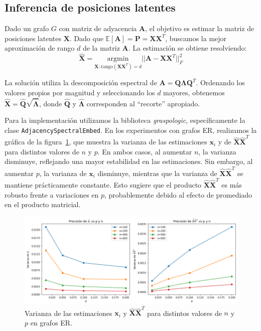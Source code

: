 \documentclass{article}
\begin{document}
\subsection{Inferencia de posiciones latentes}

Dado un grafo $G$ con matriz de adyacencia $\mathbf{A}$, el objetivo es estimar la matriz de posiciones latentes $\mathbf{X}$. Dado que $\mathbb{E}[\mathbf{A}] = \mathbf{P} = \mathbf{X}\mathbf{X}^T$, buscamos la mejor aproximación de rango $d$ de la matriz $\mathbf{A}$. La estimación se obtiene resolviendo:
\begin{equation}
    \hat{\mathbf{X}} = \underset{\mathbf{X}: \text{rango}(\mathbf{X}\mathbf{X}^T) = d}{\mathrm{argmin}} ||\mathbf{A} - \mathbf{X}\mathbf{X}^T||^2_F
\end{equation}

La solución utiliza la descomposición espectral de $\mathbf{A} = \mathbf{Q}\boldsymbol{\Lambda}\mathbf{Q}^T$. Ordenando los valores propios por magnitud y seleccionando los $d$ mayores, obtenemos $\hat{\mathbf{X}} = \hat{\mathbf{Q}}\sqrt{\hat{\boldsymbol{\Lambda}}}$, donde $\hat{\mathbf{Q}}$ y $\hat{\boldsymbol{\Lambda}}$ corresponden al ``recorte'' apropiado.

Para la implementación utilizamos la biblioteca \textit{graspologic}, específicamente la clase \newline
\verb|AdjacencySpectralEmbed|. En los experimentos con grafos ER, realizamos la gráfica de la figura~\ref{fig:precision}, que muestra la varianza de las estimaciones $\mathbf{x}_i$ y de $\hat{\mathbf{X}}\hat{\mathbf{X}}^T$ para distintos valores de $n$ y $p$. En ambos casos, al aumentar $n$, la varianza disminuye, reflejando una mayor estabilidad en las estimaciones. Sin embargo, al aumentar $p$, la varianza de $\mathbf{x}_i$ disminuye, mientras que la varianza de $\hat{\mathbf{X}}\hat{\mathbf{X}}^T$ se mantiene prácticamente constante. Esto sugiere que el producto $\hat{\mathbf{X}}\hat{\mathbf{X}}^T$ es más robusto frente a variaciones en $p$, probablemente debido al efecto de promediado en el producto matricial.

\begin{figure}[htb]
    \centering
    \includegraphics[width=0.8\linewidth]{images/precision.png}
    \caption{Varianza de las estimaciones $\mathbf{x}_i$ y $\hat{\mathbf{X}}\hat{\mathbf{X}}^T$ para distintos valores de $n$ y $p$ en grafos ER.}
    \label{fig:precision}
\end{figure}
\end{document}
